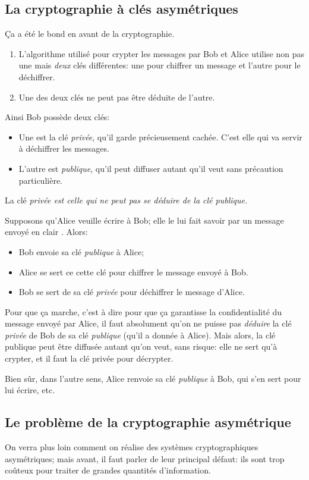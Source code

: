 \subsection{La cryptographie à clés asymétriques}
Ça a été le bond en avant de la cryptographie. 
\begin{enumerate}
\item L'algorithme utilisé pour crypter les messages par Bob et Alice
  utilise non pas une mais \emph{deux} clés différentes:  une pour
  chiffrer un message et 
   l'autre pour le déchiffrer.
\item Une des deux clés ne peut pas être déduite de l'autre.
\end{enumerate}

Ainsi Bob possède  deux clés:
\begin{itemize}
  \item Une est la clé \emph{privée}, qu'il garde précieusement
    cachée. C'est elle qui va servir à déchiffrer les messages.
  \item L'autre est \emph{publique}, qu'il peut diffuser autant qu'il
    veut sans précaution particulière.
\end{itemize}
La clé  \emph{privée est celle qui ne peut pas se déduire de la
  clé publique.} 

Supposons qu'Alice veuille écrire à Bob; elle le lui fait savoir par
un message envoyé \og en clair \fg. Alors:
\begin{itemize}
\item Bob envoie sa clé \emph{publique}
  à Alice;
\item Alice se sert ce 
  cette clé pour chiffrer le message envoyé à Bob.
\item  Bob se sert de sa clé
  \emph{privée} pour déchiffrer le message d'Alice.
\end{itemize}



Pour que ça marche, c'est à dire pour que ça garantisse la
confidentialité du message envoyé par Alice, il faut absolument qu'on ne puisse
pas \emph{déduire} la clé \emph{privée} de Bob de sa clé
\emph{publique} (qu'il a donnée à Alice). Mais alors, la clé publique
peut être diffusée autant qu'on veut, sans risque: elle ne sert qu'à
crypter, et il faut la clé privée pour décrypter.

  Bien sûr, dans
l'autre sens, Alice
renvoie sa clé  \emph{publique} à Bob, qui s'en sert pour lui écrire, etc.

\subsection{Le problème de la cryptographie asymétrique}
On verra plus loin comment on réalise  des systèmes cryptographiques
asymétriques; mais avant,  il faut parler de leur principal défaut:
ils sont trop 
coûteux pour traiter de grandes quantités d'information.

